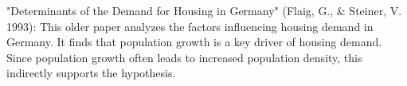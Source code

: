 \begin{sloppypar}
"Determinants of the Demand for Housing in Germany" (Flaig, G., & Steiner, V. 1993): This older paper analyzes the factors influencing housing demand in Germany. It finds that population growth is a key driver of housing demand. Since population growth often leads to increased population density, this indirectly supports the hypothesis.

\end{sloppypar}

